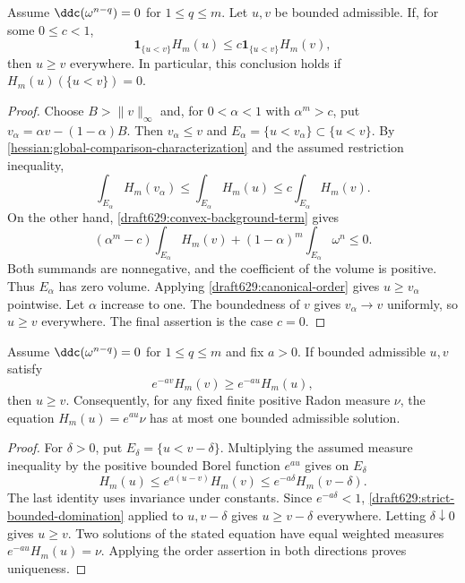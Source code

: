 \begin{theorem}\label{draft629:strict-bounded-domination}
Assume $\ddc(\omega^{n-q})=0$ for $1\leq q\leq m$. Let $u,v$
be bounded admissible. If, for some $0\leq c<1$,
\[
 \mathbf1_{\{u<v\}}H_m(u)
                   \leq c\mathbf1_{\{u<v\}}H_m(v),
\]
then $u\geq v$ everywhere. In particular, this conclusion holds
if $H_m(u)(\{u<v\})=0$.
\end{theorem}
\begin{proof}
Choose $B>\|v\|_\infty$ and, for $0<\alpha<1$ with $\alpha^m>c$,
put $v_\alpha=\alpha v-(1-\alpha)B$. Then $v_\alpha\leq v$ and
$E_\alpha=\{u<v_\alpha\}\subset\{u<v\}$.
By \cref{hessian:global-comparison-characterization} and the
assumed restriction inequality,
\[
 \int_{E_\alpha}H_m(v_\alpha)
        \leq\int_{E_\alpha}H_m(u)
        \leq c\int_{E_\alpha}H_m(v).
\]
On the other hand, \cref{draft629:convex-background-term} gives
\[
 (\alpha^m-c)\int_{E_\alpha}H_m(v)
             +(1-\alpha)^m\int_{E_\alpha}\omega^n\leq0.
\]
Both summands are nonnegative, and the coefficient of the volume
is positive. Thus $E_\alpha$ has zero volume. Applying
\cref{draft629:canonical-order} gives $u\geq v_\alpha$ pointwise.
Let $\alpha$ increase to one. The boundedness of $v$ gives
$v_\alpha\to v$ uniformly, so $u\geq v$ everywhere. The final
assertion is the case $c=0$.
\end{proof}

\begin{corollary}\label{draft629:proper-bounded-uniqueness}
Assume $\ddc(\omega^{n-q})=0$ for $1\leq q\leq m$ and fix $a>0$.
If bounded admissible $u,v$ satisfy
\[
 e^{-av}H_m(v)\geq e^{-au}H_m(u),
\]
then $u\geq v$. Consequently, for any fixed finite positive Radon
measure $\nu$, the equation $H_m(u)=e^{au}\nu$ has at most one
bounded admissible solution.
\end{corollary}
\begin{proof}
For $\delta>0$, put $E_\delta=\{u<v-\delta\}$. Multiplying the
assumed measure inequality by the positive bounded Borel function
$e^{au}$ gives on $E_\delta$
\[
 H_m(u)\leq e^{a(u-v)}H_m(v)
                 \leq e^{-a\delta}H_m(v-\delta).
\]
The last identity uses invariance under constants. Since
$e^{-a\delta}<1$, \cref{draft629:strict-bounded-domination} applied
to $u,v-\delta$ gives $u\geq v-\delta$ everywhere. Letting
$\delta\downarrow0$ gives $u\geq v$. Two solutions of the stated
equation have equal weighted measures $e^{-au}H_m(u)=\nu$.
Applying the order assertion in both directions proves uniqueness.
\end{proof}
